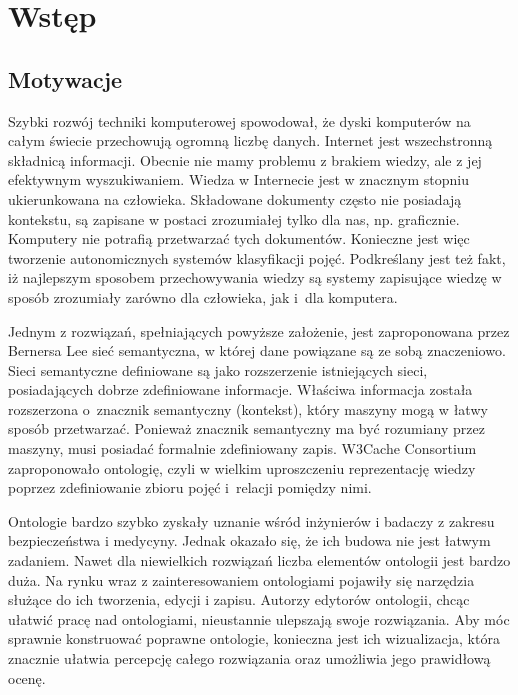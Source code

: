 \chapter{Wstęp}
\section{Motywacje}

Szybki rozwój techniki komputerowej spowodował, że dyski komputerów na całym świecie przechowują ogromną liczbę danych. Internet jest wszechstronną składnicą informacji. Obecnie
nie mamy problemu z brakiem wiedzy, ale z jej efektywnym wyszukiwaniem. Wiedza w Internecie jest w znacznym stopniu ukierunkowana na człowieka. Składowane dokumenty często nie posiadają 
kontekstu, są zapisane w postaci zrozumiałej tylko dla nas, np. graficznie. Komputery nie potrafią przetwarzać tych dokumentów. Konieczne jest więc tworzenie autonomicznych 
systemów klasyfikacji pojęć. Podkreślany jest też fakt, iż najlepszym sposobem przechowywania wiedzy są systemy zapisujące wiedzę w sposób zrozumiały zarówno dla człowieka, jak i~dla
komputera.   
\par
Jednym z rozwiązań, spełniających powyższe założenie, jest zaproponowana przez Bernersa Lee sieć semantyczna, w której dane powiązane są ze sobą znaczeniowo. Sieci semantyczne 
definiowane są jako rozszerzenie istniejących sieci, posiadających dobrze zdefiniowane informacje. Właściwa informacja została rozszerzona o~znacznik semantyczny (kontekst), 
który maszyny mogą w łatwy sposób przetwarzać. Ponieważ znacznik semantyczny ma być rozumiany przez maszyny, musi posiadać formalnie zdefiniowany zapis. W3Cache Consortium
 zaproponowało ontologię, czyli w wielkim uproszczeniu reprezentację wiedzy poprzez zdefiniowanie zbioru pojęć i~relacji pomiędzy nimi.
\par 
Ontologie bardzo szybko zyskały uznanie wśród inżynierów i badaczy z zakresu bezpieczeństwa i medycyny. Jednak okazało się, że ich budowa nie jest łatwym zadaniem. 
Nawet dla niewielkich rozwiązań liczba elementów ontologii jest bardzo duża. Na rynku wraz z zainteresowaniem ontologiami pojawiły się narzędzia służące do ich tworzenia,
 edycji i zapisu. Autorzy edytorów ontologii, chcąc ułatwić pracę nad ontologiami, nieustannie ulepszają swoje rozwiązania. Aby móc sprawnie konstruować 
poprawne ontologie, konieczna jest ich wizualizacja, która znacznie ułatwia percepcję całego rozwiązania oraz umożliwia jego prawidłową ocenę. 

